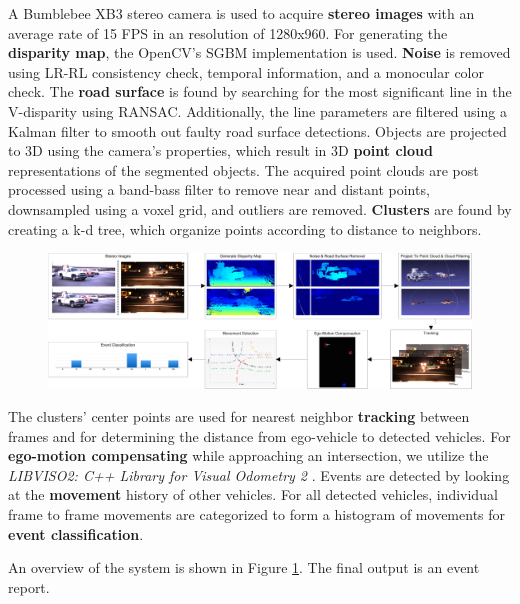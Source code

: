\vspace*{-1.5mm}
\begin{multicols}{2}   
A Bumblebee XB3 stereo camera is used to acquire \textbf{stereo images} with an average rate of 15 FPS in an resolution of 1280x960. For generating the \textbf{disparity map}, the OpenCV's SGBM\cite{HirschmullerRLandSGBM} implementation is used. \textbf{Noise} is removed using LR-RL consistency check, temporal information, and a monocular color check.
The \textbf{road surface} is found by searching for the most significant line in the V-disparity\cite{labayrade2002real} using RANSAC. Additionally, the line parameters are filtered using a Kalman filter to smooth out faulty road surface detections. 
Objects are projected to 3D using the camera's properties, which result in 3D \textbf{point cloud} representations of the segmented objects.
The acquired point clouds are post processed using a band-bass filter to remove near and distant points, downsampled using a voxel grid, and outliers are removed. \textbf{Clusters} are found by creating a k-d tree, which organize points according to distance to neighbors.
\end{multicols}

\vspace*{-2.5mm}
\begin{figure}[H]
  \centering
  \includegraphics[width=1\textwidth]{text/figures/methods/flowChart.png}
  \label{systemOverview::systemOverview}
\end{figure}
\begin{multicols}{2}   
The clusters' center points are used for nearest neighbor \textbf{tracking} between frames and for determining the distance from ego-vehicle to detected vehicles.
For \textbf{ego-motion compensating} while approaching an intersection, we utilize the \textit{LIBVISO2: C++ Library for Visual Odometry 2} \cite{Geiger2011IV}. 
Events are detected by looking at the \textbf{movement} history of other vehicles. For all detected vehicles, individual frame to frame movements are categorized to form a histogram of movements for \textbf{event classification}.

An overview of the system is shown in Figure \ref{systemOverview::systemOverview}. The final output is an event report.

\end{multicols}


